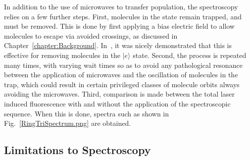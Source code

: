 
In addition to the use of microwaves to transfer population, the spectroscopy relies on a few further steps.
First, molecules in the  state remain trapped, and must be removed.
This is done by first applying a bias electric field to allow molecules to escape via avoided crossings, as discussed in Chapter~\ref{chapter:Background}.
In~\cite{Stuhl2012uwave}, it was nicely demonstrated that this is effective for removing molecules in the $|e\rangle$ state.
Second, the process is repeated many times, with varying wait times so as to avoid any pathological resonance between the application of microwaves and the oscillation of molecules in the trap, which could result in certain privileged classes of molecule orbits always avoiding the microwaves.
Third, comparison is made between the total laser induced fluorescence with and without the application of the spectroscopic sequence.
When this is done, spectra such as shown in Fig.~\ref{RingTriSpectrum.png} are obtained.


\subsection{Limitations to Spectroscopy}\label{limitationsection}

